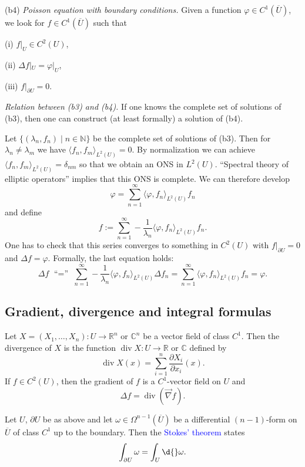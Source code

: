 \documentclass[12pt, oneside, a4paper]{article}
\def\grad{\operatorname{grad}}
\def\divergence{\operatorname{div}}
\theoremstyle{dfn}
\def \grad {\overrightarrow{\nabla}}
\newcommand{\scalprod}[2]{\langle #1,#2 \rangle}
\def\Nbb{\mathbb{N}}
\def\Rbb{\ensuremath{\mathbb{R}}}
\newcommand{\Com}{\mathbb{C}}
\begin{document}
\noindent (b4) \emph{Poisson equation with boundary conditions.}
Given a function $\varphi \in C^1(\overline{U})$, we look for $f \in C^1(\overline{U})$ such that

(i) $f|_U \in C^2(U)$,

(ii) $\Delta f|_U = \varphi|_U$,

(iii) $f|_{\partial U} = 0$.

\vspace{6pt}
\noindent \emph{Relation between \emph{(b3)} and \emph{(b4)}.}
If one knows the complete set of solutions of (b3), then one can construct (at least formally) a solution of (b4).

Let $\{ (\lambda_n, f_n) \mid n \in \Nbb \}$ be the complete set of solutions of (b3). Then for $\lambda_n \neq \lambda_m$ we have $\scalprod{f_n}{f_m}_{L^2(U)} = 0$. By normalization we can achieve $\scalprod{f_n}{f_m}_{L^2(U)} = \delta_{nm}$ so that we obtain an ONS in $L^2(U)$. ``Spectral theory of elliptic operators'' implies that this ONS is complete. We can therefore develop
\[
\varphi = \sum_{n=1}^\infty \scalprod{\varphi}{f_n}_{L^2(U)} f_n
\]
and define
\[
f := \sum_{n=1}^\infty -\frac{1}{\lambda_n}\scalprod{\varphi}{f_n}_{L^2(U)} f_n.
\]
One has to check that this series converges to something in $C^2(U)$ with $f|_{\partial U} = 0$ and $\Delta f = \varphi$. Formally, the last equation holds:
\[
\Delta f
\text{ ``$=$'' } \sum_{n=1}^\infty -\frac{1}{\lambda_n}\scalprod{\varphi}{f_n}_{L^2(U)} \Delta f_n
= \sum_{n=1}^\infty \scalprod{\varphi}{f_n}_{L^2(U)} f_n
= \varphi.
\]

\subsection{Gradient, divergence and integral formulas}

Let $X = (X_1, \dots, X_n) \colon U \to \Rbb^n$ or $\Com^n$ be a vector field of class $C^1$. Then the divergence of $X$ is the function $\divergence X \colon U \to \Rbb$ or $\Com$ defined by
\[
\divergence X(x) = \sum_{i=1}^n \frac{\partial X_i}{\partial x_i} (x).
\]
If $f \in C^2(U)$, then the gradient of $f$ is a $C^1$-vector field on $U$ and
\[
\Delta f = \divergence(\grad f).
\]

Let $U$, $\partial U$ be as above and let $\omega \in \Omega^{n-1}(\overline{U})$ be a differential $(n-1)$-form on $\overline{U}$ of class $C^1$ up to the boundary. Then the \textcolor{blue}{Stokes' theorem} states
\begin{equation}\label{eq:Stokes}
\int_{\partial U} \omega = \int_U \d{}\omega.
\end{equation}
\end{document}
